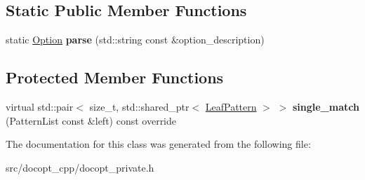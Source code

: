\subsection*{Static Public Member Functions}
\begin{DoxyCompactItemize}
\item 
\mbox{\label{classdocopt_1_1Option_a49f14de794c19528b07cd6f39604a1a5}} 
static \hyperlink{classdocopt_1_1Option}{Option} {\bfseries parse} (std\+::string const \&option\+\_\+description)
\end{DoxyCompactItemize}
\subsection*{Protected Member Functions}
\begin{DoxyCompactItemize}
\item 
\mbox{\label{classdocopt_1_1Option_a8b395e69aa9718c6373330c8e29d3743}} 
virtual std\+::pair$<$ size\+\_\+t, std\+::shared\+\_\+ptr$<$ \hyperlink{classdocopt_1_1LeafPattern}{Leaf\+Pattern} $>$ $>$ {\bfseries single\+\_\+match} (Pattern\+List const \&left) const override
\end{DoxyCompactItemize}


The documentation for this class was generated from the following file\+:\begin{DoxyCompactItemize}
\item 
src/docopt\+\_\+cpp/docopt\+\_\+private.\+h\end{DoxyCompactItemize}
